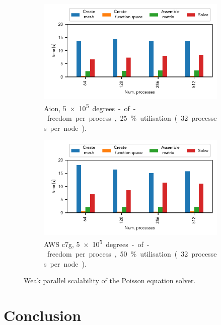 \begin{figure}
    \begin{subfigure}{.7\textwidth}
        \centering
        \includegraphics{chapters/chp1/imgs/parallel_scaling_plots/output/weak_scaling_aion_poisson.pdf}
        \caption{Aion, \SI{5e+5} degrees-of-freedom per process, 25 \% utilisation (32 processes per node).}
        \label{fig:weak-scaling-aion}
    \end{subfigure}

    \begin{subfigure}{.7\textwidth}
        \centering
        \includegraphics{chapters/chp1/imgs/parallel_scaling_plots/output/weak_scaling_aws_big_poisson.pdf}
        \caption{AWS c7g, \SI{5e+5} degrees-of-freedom per process, 50 \% utilisation (32 processes per node).}
        \label{fig:weak-scaling-aws}
    \end{subfigure}
    \caption{Weak parallel scalability of the Poisson equation solver.}
    \label{fig:weak-scaling}
\end{figure}

\section*{Conclusion}

